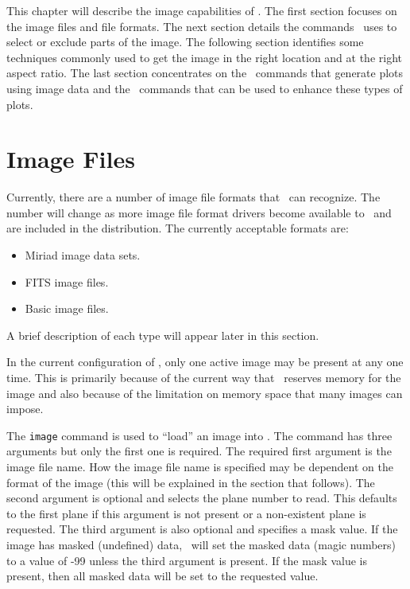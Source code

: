 %
%

This chapter will describe the image capabilities of \wip.
The first section focuses on the image files and file formats.
The next section details the commands \wip\ uses to select
or exclude parts of the image.
The following section identifies some techniques commonly used to get
the image in the right location and at the right aspect ratio. 
The last section concentrates on the \wip\ commands that generate plots
using image data and the \wip\ commands that can be used to enhance
these types of plots.

\section		{Image Files}

Currently, there are a number of image file formats that \wip\ can recognize.
The number will change as more image file format drivers become available to
\wip\ and are included in the distribution.
The currently acceptable formats are:
\begin{itemize}
  \item Miriad image data sets.
  \item FITS image files.
  \item Basic image files.
\end{itemize}
A brief description of each type will appear later in this section.

In the current configuration of \wip, only
one active image may be present at any one time.
This is primarily because of the current way that \wip\ reserves
memory for the image and also because of the limitation on memory space
that many images can impose.

The
{\tt image}%
command is used to ``load'' an image into \wip.
The command has three arguments but only the first one is required.
The required first argument is the image file name.
How the image file name is specified may be dependent on the format of the
image (this will be explained in the section that follows).
The second argument is optional and selects the plane number to read.
This defaults to the first plane if this argument is not present or a
non-existent plane is requested.
The third argument is also optional and specifies a mask value.
If the image has masked (undefined) data,
\wip\ will set the masked data (\eg magic numbers)
to a value of -99 unless the third argument is present.
If the mask value is present, then all masked data will be set to the
requested value.

